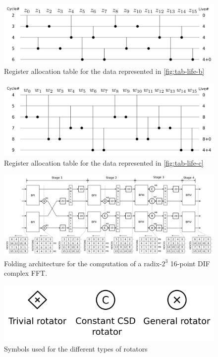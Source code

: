 \documentclass[journal,comsoc]{IEEEtran}
\begin{document}
\begin{figure}[htbp]%
\centering
 \includegraphics[width=1\linewidth]{Diagramas/life_chart_b.png}%
\caption{Register allocation table for the data represented in \ref{fig:tab-life-b}}
\label{fig:tab-aloc-b}
\end{figure}

\begin{figure}[htbp]%
\centering
 \includegraphics[width=1\linewidth]{Diagramas/life_chart_c.png}%
\caption{Register allocation table for the data represented in \ref{fig:tab-life-c}}
\label{fig:tab-aloc-c}
\end{figure}

\begin{figure}[htbp]%
\centering
 \includegraphics[width=0.85\linewidth]{Diagramas/folding-16.png}%
\caption{Folding architecture for the computation of a radix-$2^3$ 16-point DIF complex FFT.}
\label{fig:circ-folding-16}
\end{figure}

\begin{figure}[htbp]%
\centering
 \includegraphics[width=0.85\linewidth]{Diagramas/rotators.png}%
\caption{Symbols used for the different types of rotators}
\label{fig:rotators}
\end{figure}
\end{document}
